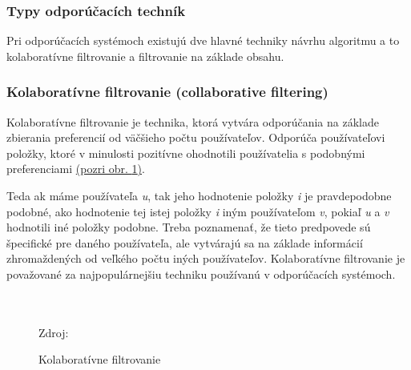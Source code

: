 \subsubsection{Typy odporúčacích techník}
Pri odporúčacích systémoch existujú dve hlavné techniky návrhu algoritmu a to kolaboratívne filtrovanie a filtrovanie na základe obsahu.\\

\subsubsection{Kolaboratívne filtrovanie (collaborative filtering)}
Kolaboratívne filtrovanie je technika, ktorá vytvára odporúčania na základe zbierania preferencií od väčšieho počtu používateľov. Odporúča používateľovi položky, ktoré v minulosti pozitívne ohodnotili používatelia s podobnými preferenciami \hyperref[collaborativeFiltering]{(pozri obr. \ref{collaborativeFiltering})}. 

Teda ak máme používateľa  \textit{u}, tak jeho hodnotenie položky \textit{i} je pravdepodobne podobné, ako hodnotenie tej istej položky \textit{i} iným používateľom \textit{v}, pokiaľ \textit{u} a \textit{v} hodnotili iné položky podobne. Treba poznamenať, že tieto predpovede sú špecifické pre daného používateľa, ale vytvárajú sa na základe informácií zhromaždených od veľkého počtu iných používateľov. Kolaboratívne filtrovanie je považované za najpopulárnejšiu techniku používanú v odporúčacích systémoch. \cite{rs1} \\\\\\


\begin{figure}[!htbp]
  \centering  
  \def\stackalignment{c}
           {\scriptsize%
            Zdroj: \cite{rs3}}
  \caption{Kolaboratívne filtrovanie}
  
  \label{collaborativeFiltering}
\end{figure}

